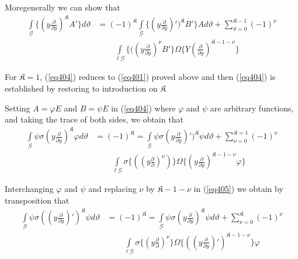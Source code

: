 More\pageoriginale generally we can show that 
\begin{align*}
\int\limits_{\mathscr{G}}\bigg\{  (y \frac{\partial }{\partial
  y})^\mathfrak{K} A ' \bigg\} d \vartheta & = (-1) ^\mathfrak{K}
\int\limits_{\mathscr{G}}\bigg\{  (y \frac{\partial }{\partial
  y})')^\mathfrak{K} B' \bigg\}  A d \vartheta 
+ \sum_{ \vartheta = 0}^
           {{\mathfrak{K} - 1}} (- 1)^\nu\\
& \qquad  \int\limits_{\ell
             \mathscr{G}}\bigg\{  ((y \frac{\partial }{\partial
             y})^\nu  B' \bigg\} \Omega \bigg\{ Y(\frac{\partial
           }{\partial y})^{ \mathfrak{K} - 1 - \nu}\bigg\}
           \tag{404}\label{eq404}  
\end{align*}

For $\mathfrak{K} = 1$, (\ref{eq404}) reduces to (\ref{eq401}) proved
above and then (\ref{eq404}) is established by restoring to
introduction on $\mathfrak{K}$   

Setting $A = \varphi E$ and $B = \psi E$  in (\ref{eq404}) where $\varphi$
and $\psi$ are arbitrary functions, and taking the trace of both
sides, we obtain that  
\begin{align*}
\int\limits_{ \mathscr{G}} \psi \sigma (y \frac{\partial}{\partial
  y})^{\mathfrak{K}} \varphi d \vartheta & = (-1)^{\mathfrak{K} }
=\int\limits_{ \mathscr{G}} \psi \sigma (y \frac{\partial}{\partial
  y})')^{\mathfrak{K}}  \psi d \vartheta + \sum^{\mathfrak{K}=1}_{ \nu =
  0}( -1)^\nu \\
& \qquad \int\limits_{\ell \mathscr{G} } \sigma \bigg\{ ((y
\frac{\partial }{\partial})^\nu )\bigg\}\Omega \bigg\{  (y
\frac{\partial}{\partial y})^{\mathfrak{K} - 1 -\nu} \varphi \bigg\}
\tag{405}\label{eq405} 
\end{align*}

Interchanging $\varphi$ and $\psi$ and replacing $\nu $ by
$\mathfrak{K} - 1-\nu $ in (\ref{eq405}) we obtain by transposition that  
\begin{align*}
\int\limits_{ \mathscr{G}} \psi \sigma ((y \frac{\partial}{\partial
  y})')^{\mathfrak{K}} \psi d \vartheta & = (-1)^{\mathfrak{K} }
=\int\limits_{ \mathscr{G}} \psi \sigma (y \frac{\partial}{\partial
  y})^{\mathfrak{K}} \psi d \vartheta + \sum^{\mathfrak{K}}_{ \nu = 0}(
-1)^\nu \\
& \qquad \int\limits_{\ell \mathscr{G} } \sigma \bigg\{ (y
\frac{\partial }{\partial})^\nu \bigg\}\Omega \bigg\{  ((y
\frac{\partial}{\partial y})')^{\mathfrak{K} - 1 -\nu}\bigg\}  \varphi
\tag{406}\label{eq406} 
\end{align*}

